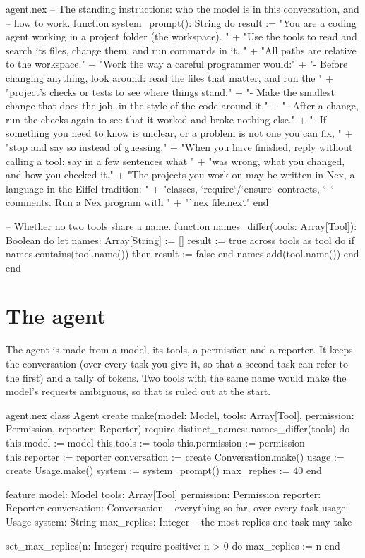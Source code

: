 \begin{append}{agent.nex}
-- The standing instructions: who the model is in this conversation, and
-- how to work.
function system_prompt(): String do
  result := "You are a coding agent working in a project folder (the workspace). "
    + "Use the tools to read and search its files, change them, and run commands in it. "
    + "All paths are relative to the workspace.\n\n"
    + "Work the way a careful programmer would:\n"
    + "- Before changing anything, look around: read the files that matter, and run the "
    + "project's checks or tests to see where things stand.\n"
    + "- Make the smallest change that does the job, in the style of the code around it.\n"
    + "- After a change, run the checks again to see that it worked and broke nothing else.\n"
    + "- If something you need to know is unclear, or a problem is not one you can fix, "
    + "stop and say so instead of guessing.\n\n"
    + "When you have finished, reply without calling a tool: say in a few sentences what "
    + "was wrong, what you changed, and how you checked it.\n\n"
    + "The projects you work on may be written in Nex, a language in the Eiffel tradition: "
    + "classes, `require`/`ensure` contracts, `--` comments. Run a Nex program with "
    + "`nex file.nex`."
end

-- Whether no two tools share a name.
function names_differ(tools: Array[Tool]): Boolean do
  let names: Array[String] := []
  result := true
  across tools as tool do
    if names.contains(tool.name()) then
      result := false
    end
    names.add(tool.name())
  end
end
\end{append}

\section{The agent}

The agent is made from a model, its tools, a permission and a reporter. It
keeps the conversation (over every task you give it, so that a second task
can refer to the first) and a tally of tokens. Two tools with the same name
would make the model's requests ambiguous, so that is ruled out at the
start.

\begin{append}{agent.nex}
class Agent
create
  make(model: Model, tools: Array[Tool], permission: Permission, reporter: Reporter)
  require
    distinct_names: names_differ(tools)
  do
    this.model := model
    this.tools := tools
    this.permission := permission
    this.reporter := reporter
    conversation := create Conversation.make()
    usage := create Usage.make()
    system := system_prompt()
    max_replies := 40
  end

feature
  model: Model
  tools: Array[Tool]
  permission: Permission
  reporter: Reporter
  conversation: Conversation   -- everything so far, over every task
  usage: Usage
  system: String
  max_replies: Integer         -- the most replies one task may take

  set_max_replies(n: Integer)
  require
    positive: n > 0
  do
    max_replies := n
  end
\end{append}

